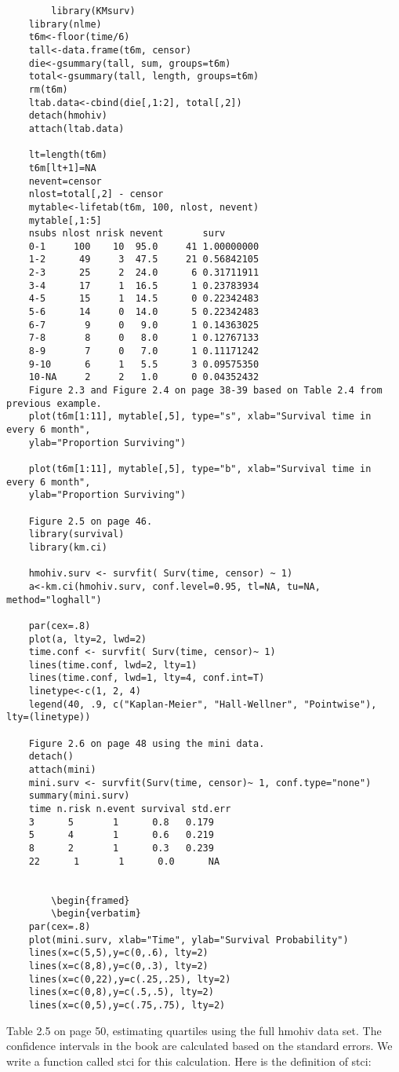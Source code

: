 		\begin{framed}
		\begin{verbatim}
		library(KMsurv)
	library(nlme)
	t6m<-floor(time/6)
	tall<-data.frame(t6m, censor)
	die<-gsummary(tall, sum, groups=t6m)
	total<-gsummary(tall, length, groups=t6m)
	rm(t6m)
	ltab.data<-cbind(die[,1:2], total[,2])
	detach(hmohiv)
	attach(ltab.data)
	
	lt=length(t6m)
	t6m[lt+1]=NA
	nevent=censor
	nlost=total[,2] - censor
	mytable<-lifetab(t6m, 100, nlost, nevent)
	mytable[,1:5]
	nsubs nlost nrisk nevent       surv
	0-1     100    10  95.0     41 1.00000000
	1-2      49     3  47.5     21 0.56842105
	2-3      25     2  24.0      6 0.31711911
	3-4      17     1  16.5      1 0.23783934
	4-5      15     1  14.5      0 0.22342483
	5-6      14     0  14.0      5 0.22342483
	6-7       9     0   9.0      1 0.14363025
	7-8       8     0   8.0      1 0.12767133
	8-9       7     0   7.0      1 0.11171242
	9-10      6     1   5.5      3 0.09575350
	10-NA     2     2   1.0      0 0.04352432
	Figure 2.3 and Figure 2.4 on page 38-39 based on Table 2.4 from previous example.
	plot(t6m[1:11], mytable[,5], type="s", xlab="Survival time in every 6 month", 
	ylab="Proportion Surviving")
	
	plot(t6m[1:11], mytable[,5], type="b", xlab="Survival time in every 6 month", 
	ylab="Proportion Surviving")
	
	Figure 2.5 on page 46.
	library(survival)
	library(km.ci)
	
	hmohiv.surv <- survfit( Surv(time, censor) ~ 1)
	a<-km.ci(hmohiv.surv, conf.level=0.95, tl=NA, tu=NA, method="loghall")
	
	par(cex=.8)
	plot(a, lty=2, lwd=2)
	time.conf <- survfit( Surv(time, censor)~ 1)
	lines(time.conf, lwd=2, lty=1)
	lines(time.conf, lwd=1, lty=4, conf.int=T)
	linetype<-c(1, 2, 4)
	legend(40, .9, c("Kaplan-Meier", "Hall-Wellner", "Pointwise"), lty=(linetype))
	
	Figure 2.6 on page 48 using the mini data.
	detach()
	attach(mini)
	mini.surv <- survfit(Surv(time, censor)~ 1, conf.type="none")
	summary(mini.surv)
	time n.risk n.event survival std.err
	3      5       1      0.8   0.179
	5      4       1      0.6   0.219
	8      2       1      0.3   0.239
	22      1       1      0.0      NA
	
	
		\begin{framed}
		\begin{verbatim}
	par(cex=.8)
	plot(mini.surv, xlab="Time", ylab="Survival Probability")
	lines(x=c(5,5),y=c(0,.6), lty=2) 
	lines(x=c(8,8),y=c(0,.3), lty=2)
	lines(x=c(0,22),y=c(.25,.25), lty=2) 
	lines(x=c(0,8),y=c(.5,.5), lty=2)
	lines(x=c(0,5),y=c(.75,.75), lty=2)

\end{verbatim}
\end{framed}
	Table 2.5 on page 50, estimating quartiles using the full hmohiv data set. The confidence intervals in the book are calculated based on the standard errors. We write a function called stci for this calculation. Here is the definition of stci:
	
